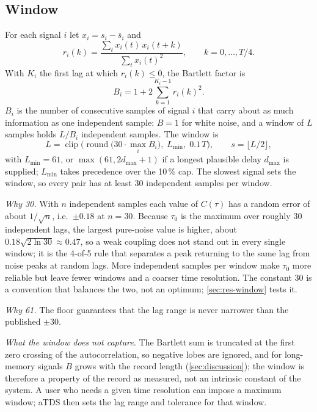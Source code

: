 \documentclass[11pt,a4paper]{article}
\begin{document}
\subsection{Window}
\label{sec:window}
For each signal $i$ let $x_i = s_i - \bar s_i$ and
\begin{equation}
r_i(k) = \frac{\sum_t x_i(t)\, x_i(t+k)}{\sum_t x_i(t)^2}, \qquad k = 0, \dots, T/4 .
\end{equation}
With $K_i$ the first lag at which $r_i(k) \le 0$, the Bartlett factor is
\begin{equation}
B_i = 1 + 2 \sum_{k=1}^{K_i - 1} r_i(k)^2 .
\label{eq:bartlett}
\end{equation}
$B_i$ is the number of consecutive samples of signal $i$ that carry about as much information as one independent sample: $B = 1$ for white noise, and a window of $L$ samples holds $L / B_i$ independent samples. The window is
\begin{equation}
L = \operatorname{clip}\!\Big(\operatorname{round}\big(30 \cdot \max_i B_i\big),\; L_{\min},\; 0.1\,T\Big), \qquad s = \lfloor L/2 \rfloor ,
\label{eq:window}
\end{equation}
with $L_{\min} = 61$, or $\max(61, 2 d_{\max} + 1)$ if a longest plausible delay $d_{\max}$ is supplied; $L_{\min}$ takes precedence over the 10\,\% cap. The slowest signal sets the window, so every pair has at least 30 independent samples per window.

\emph{Why 30.} With $n$ independent samples each value of $C(\tau)$ has a random error of about $1/\sqrt{n}$, i.e.\ $\pm0.18$ at $n = 30$. Because $\tau_0$ is the maximum over roughly 30 independent lags, the largest pure-noise value is higher, about $0.18\sqrt{2\ln 30} \approx 0.47$, so a weak coupling does not stand out in every single window; it is the 4-of-5 rule that separates a peak returning to the same lag from noise peaks at random lags. More independent samples per window make $\tau_0$ more reliable but leave fewer windows and a coarser time resolution. The constant 30 is a convention that balances the two, not an optimum; \cref{sec:res-window} tests it.

\emph{Why 61.} The floor guarantees that the lag range is never narrower than the published $\pm30$.

\emph{What the window does not capture.} The Bartlett sum is truncated at the first zero crossing of the autocorrelation, so negative lobes are ignored, and for long-memory signals $B$ grows with the record length (\cref{sec:discussion}); the window is therefore a property of the record as measured, not an intrinsic constant of the system. A user who needs a given time resolution can impose a maximum window; aTDS then sets the lag range and tolerance for that window.
\end{document}
